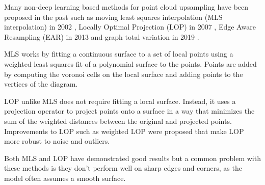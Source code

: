 Many non-deep learning based methods for point cloud upsampling have been proposed in the past such as moving least squares interpolation (MLS interpolation) in 2002 \cite{Alexa2003ComputingAR},
Locally Optimal Projection (LOP) in 2007 \cite{LOP}, Edge Aware Resampling (EAR) in 2013 \cite{EdgeAwareResampling} and graph total variation in 2019 \cite{GraphTotalVariation}.


MLS works by fitting a continuous surface to a set of local points using a weighted least squares fit of a polynomial surface to the points. 
Points are added by computing the voronoi cells on the local surface and adding points to the vertices of the diagram.

LOP unlike MLS does not require fitting a local surface. Instead, it uses a projection operator to project points onto a surface in a way that minimizes the sum of the weighted distances between the original and projected points. Improvements to LOP such as weighted LOP \cite{WLOP} were proposed that make LOP more robust to noise and outliers. 

Both MLS and LOP have demonstrated good results but a common problem with these methods is they don't perform well on sharp edges and corners, as the model often assumes a smooth surface.



